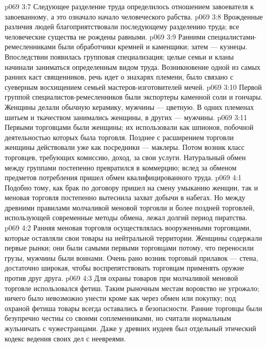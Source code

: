 \vs p069 3:7 \bibnobreakspace {} Следующее разделение труда определилось отношением завоевателя к завоеванному, а это означало начало человеческого рабства.
\vs p069 3:8 \bibnobreakspace {} Врожденные различия людей благоприятствовали последующему разделению труда; все человеческие существа не рождены равными.
\vs p069 3:9 Ранними специалистами\hyp{}ремесленниками были обработчики кремней и каменщики; затем --- кузнецы. Впоследствии появилась групповая специализация; целые семьи и кланы начинали заниматься определенным видом труда. Возникновение одной из самых ранних каст священников, речь идет о знахарях племени, было связано с суеверным восхищением семьей мастеров\hyp{}изготовителей мечей.
\vs p069 3:10 \pc Первой группой специалистов\hyp{}ремесленников были экспортеры каменной соли и гончары. Женщины делали обычную керамику, мужчины --- цветную. В одних племенах шитьем и ткачеством занимались женщины, в других --- мужчины.
\vs p069 3:11 Первыми торговцами были женщины; их использовали как шпионов, побочной деятельностью которых была торговля. Позднее с расширением торговли женщины действовали уже как посредники --- маклеры. Потом возник класс торговцев, требующих комиссию, доход, за свои услуги. Натуральный обмен между группами постепенно превратился в коммерцию; вслед за обменом предметов потребления пришел обмен квалифицированного труда.
\vs p069 4:1 Подобно тому, как брак по договору пришел на смену умыканию женщин, так и меновая торговля постепенно вытеснила захват добычи в набегах. Но между древними правилами молчаливой меновой торговли и более поздней торговлей, использующей современные методы обмена, лежал долгий период пиратства.
\vs p069 4:2 Ранняя меновая торговля осуществлялась вооруженными торговцами, которые оставляли свои товары на нейтральной территории. Женщины содержали первые рынки; они были самыми первыми торговцами потому, что переносили грузы, мужчины были воинами. Очень рано возник торговый прилавок --- стена, достаточно широкая, чтобы воспрепятствовать торговцам применять оружие против друг друга.
\vs p069 4:3 Для охраны товаров при молчаливой меновой торговле использовался фетиш. Таким рыночным местам воровство не угрожало; ничего было невозможно унести кроме как через обмен или покупку; под охраной фетиша товары всегда оставались в безопасности. Ранние торговцы были безупречно честны со своими соплеменниками, но считали нормальным жульничать с чужестранцами. Даже у древних иудеев был отдельный этический кодекс ведения своих дел с неевреями.
